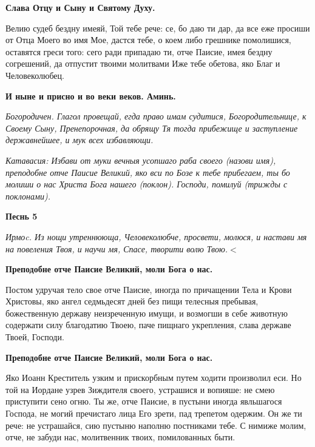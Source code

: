 \bfseries Слава Отцу и Сыну и Святому Духу.\normalfont{} 




Велию судеб бездну имеяй, Той тебе рече: се, бо даю ти дар, да все еже просиши от Отца Моего во имя Мое, дастся тебе, о коем либо грешнике
помолишися, оставятся греси того: сего ради припадаю ти, отче Паисие, имея бездну согрешений, да отпустит твоими молитвами Иже тебе обетова, яко Благ и Человеколюбец. 




\bfseries И ныне и присно и во веки веков. Аминь.\normalfont{} 




\itshape Богородичен.\normalfont{} Глагол провещай, егда право имам судитися, Богородительнице, к Своему Сыну, Пренепорочная, да обрящу Тя тогда прибежище и заступление державнейшее, и мук всех избавляющи. 




\itshape Катавасия:\normalfont{} Избави от муки вечныя усопшаго раба своего (\itshape назови имя\normalfont{}), преподобне отче Паисие Великий, яко вси по Бозе к тебе прибегаем, ты бо молиши о нас Христа Бога нашего (\itshape поклон\normalfont{}). Господи, помилуй (\itshape трижды с поклонами\normalfont{}). 




\bfseries Песнь 5\normalfont{}\nopagebreak




\itshape Ирмоc.\normalfont{} Из нощи утреннююща, Человеколюбче, просвети, молюся, и настави мя на повеления Твоя, и научи мя, Спасе, творити волю Твою.$<$ 




\bfseries Преподобне отче Паисие Великий, моли Бога о нас. \normalfont{}\nopagebreak




Постом удручая тело свое отче Паисие, иногда по причащении Тела и Крови Христовы, яко ангел седмьдесят дней без пищи телесныя пребывая, божественную державу неизреченную имущи, и возмогши в себе животную содержати силу благодатию Твоею, паче пищнаго укрепления, слава державе Твоей, Господи. 




\bfseries Преподобне отче Паисие Великий, моли Бога о нас. \normalfont{}\nopagebreak




Яко Иоанн Креститель узким и прискорбным путем ходити произволил еси. Но той на Иордане узрев Зиждителя своего, устрашися и вопияше: не смею приступити сено огню. Ты же, отче Паисие, в пустыни иногда явльшагося Господа, не могий пречистаго лица Его зрети, пад трепетом одержим. Он же ти рече: не устрашайся, сию пустыню наполню постниками тебе. С нимиже молим, отче, не забуди нас, молитвенник твоих, помилованных быти. 




